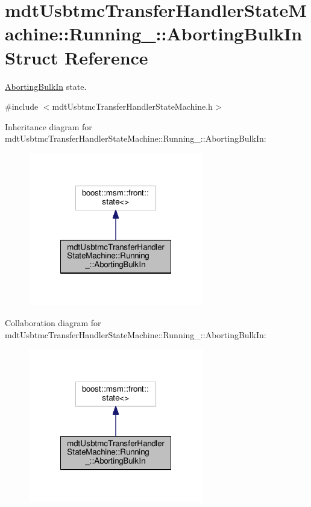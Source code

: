 \hypertarget{structmdt_usbtmc_transfer_handler_state_machine_1_1_running___1_1_aborting_bulk_in}{\section{mdt\-Usbtmc\-Transfer\-Handler\-State\-Machine\-:\-:Running\-\_\-\-:\-:Aborting\-Bulk\-In Struct Reference}
\label{structmdt_usbtmc_transfer_handler_state_machine_1_1_running___1_1_aborting_bulk_in}
}


\hyperlink{structmdt_usbtmc_transfer_handler_state_machine_1_1_running___1_1_aborting_bulk_in}{Aborting\-Bulk\-In} state.  




{\ttfamily \#include $<$mdt\-Usbtmc\-Transfer\-Handler\-State\-Machine.\-h$>$}



Inheritance diagram for mdt\-Usbtmc\-Transfer\-Handler\-State\-Machine\-:\-:Running\-\_\-\-:\-:Aborting\-Bulk\-In\-:\nopagebreak
\begin{figure}[H]
\begin{center}
\leavevmode
\includegraphics[width=216pt]{structmdt_usbtmc_transfer_handler_state_machine_1_1_running___1_1_aborting_bulk_in__inherit__graph}
\end{center}
\end{figure}


Collaboration diagram for mdt\-Usbtmc\-Transfer\-Handler\-State\-Machine\-:\-:Running\-\_\-\-:\-:Aborting\-Bulk\-In\-:\nopagebreak
\begin{figure}[H]
\begin{center}
\leavevmode
\includegraphics[width=216pt]{structmdt_usbtmc_transfer_handler_state_machine_1_1_running___1_1_aborting_bulk_in__coll__graph}
\end{center}
\end{figure}
